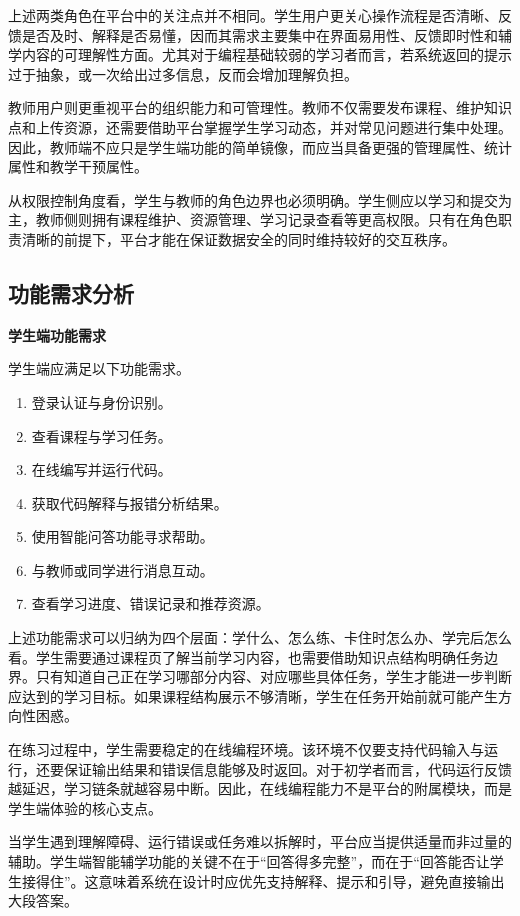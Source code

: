 上述两类角色在平台中的关注点并不相同。学生用户更关心操作流程是否清晰、反馈是否及时、解释是否易懂，因而其需求主要集中在界面易用性、反馈即时性和辅学内容的可理解性方面。尤其对于编程基础较弱的学习者而言，若系统返回的提示过于抽象，或一次给出过多信息，反而会增加理解负担\cite{yan2025collaborative}。

教师用户则更重视平台的组织能力和可管理性。教师不仅需要发布课程、维护知识点和上传资源，还需要借助平台掌握学生学习动态，并对常见问题进行集中处理。因此，教师端不应只是学生端功能的简单镜像，而应当具备更强的管理属性、统计属性和教学干预属性。

从权限控制角度看，学生与教师的角色边界也必须明确。学生侧应以学习和提交为主，教师侧则拥有课程维护、资源管理、学习记录查看等更高权限。只有在角色职责清晰的前提下，平台才能在保证数据安全的同时维持较好的交互秩序。

\subsection{功能需求分析}
\textbf{学生端功能需求}

学生端应满足以下功能需求。
\begin{enumerate}
  \item 登录认证与身份识别。
  \item 查看课程与学习任务。
  \item 在线编写并运行代码。
  \item 获取代码解释与报错分析结果。
  \item 使用智能问答功能寻求帮助。
  \item 与教师或同学进行消息互动。
  \item 查看学习进度、错误记录和推荐资源。
\end{enumerate}

上述功能需求可以归纳为四个层面：学什么、怎么练、卡住时怎么办、学完后怎么看。学生需要通过课程页了解当前学习内容，也需要借助知识点结构明确任务边界。只有知道自己正在学习哪部分内容、对应哪些具体任务，学生才能进一步判断应达到的学习目标。如果课程结构展示不够清晰，学生在任务开始前就可能产生方向性困惑。

在练习过程中，学生需要稳定的在线编程环境。该环境不仅要支持代码输入与运行，还要保证输出结果和错误信息能够及时返回。对于初学者而言，代码运行反馈越延迟，学习链条就越容易中断。因此，在线编程能力不是平台的附属模块，而是学生端体验的核心支点。

当学生遇到理解障碍、运行错误或任务难以拆解时，平台应当提供适量而非过量的辅助。学生端智能辅学功能的关键不在于“回答得多完整”，而在于“回答能否让学生接得住”。这意味着系统在设计时应优先支持解释、提示和引导，避免直接输出大段答案。

